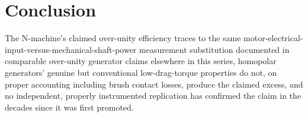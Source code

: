 \documentclass[11pt]{article}
\begin{document}
\section{Conclusion}

The N-machine's claimed over-unity efficiency traces to the same motor-electrical-input-versus-mechanical-shaft-power measurement substitution documented in comparable over-unity generator claims elsewhere in this series, homopolar generators' genuine but conventional low-drag-torque properties do not, on proper accounting including brush contact losses, produce the claimed excess, and no independent, properly instrumented replication has confirmed the claim in the decades since it was first promoted.
\end{document}
